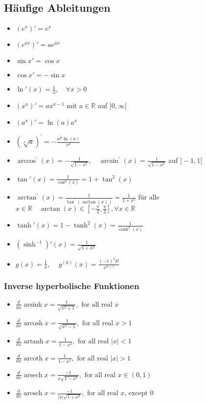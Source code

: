 \documentclass[a3paper, 11pt, landscape]{scrartcl}
\begin{document}
\begin{multicols*}{3}
    \subsection{Häufige Ableitungen}
    \begin{itemize}
        \item $(e^x)' = e^x$
        \item $(e^{ax})' = ae^{ax}$
        \item $\sin x ' = \cos x$
        \item $\cos x ' = -\sin x$
        \item $\ln'(x)=\frac{1}{x}, \quad \forall x >0$
        \item $(x^a)' = ax^{a-1}$ mit $a\in \mathbb{R}$ auf $]0,\infty[$
        \item $(a^x)'=\ln(a)a^x$
        \item $(\sqrt[x]{a})^{\prime}=-\frac{a^{\frac{1}{x}} \ln (a)}{x^{2}}$
        \item $\arccos ^{\prime}(x)=-\frac{1}{\sqrt{1-x^{2}}}, \quad \arcsin ^{\prime}(x)=\frac{1}{\sqrt{1-x^{2}}}$ auf $]-1,1[$
        \item $\tan'(x)=\frac{1}{\cos^2(x)}=1 + \tan^2(x)$
        \item $\arctan ^{\prime}(x)=\frac{1}{\tan ^{\prime}(\arctan (x))}=\frac{1}{1+x^2}$ für alle $x\in \mathbb{R}\quad \arctan (x) \in [-\frac{\pi}{2},\frac{\pi}{2}], \forall x \in \mathbb{R}$ 
        \item $\tanh'(x)=1-\tanh ^2(x)=\frac{1}{\cosh^2(x)}$
        \item $(\sinh ^{-1})' (x)=\frac{1}{\sqrt{1+x^2}}$
        \item $g(x)=\frac{1}{x}$, $\quad g^{(k)}(x)=\frac{(-1)^{k} k !}{x^{k+1}}$
    \end{itemize}
    
    \subsubsection{Inverse hyperbolische Funktionen}
    \begin{itemize}
        \item $\frac{d}{dx} \operatorname{arsinh} x {}= \frac{1}{\sqrt{x^2+1}}, \text{ for all real } x$
        \item $\frac{d}{dx} \operatorname{arcosh} x  {}= \frac{1}{\sqrt{x^2-1}}, \text{ for all real } x>1$
        \item $\frac{d}{dx} \operatorname{artanh} x  {}= \frac{1}{1-x^2}, \text{ for all real } |x|<1$
        \item $\frac{d}{dx} \operatorname{arcoth} x  {}= \frac{1}{1-x^2}, \text{ for all real } |x|>1$
        \item $\frac{d}{dx} \operatorname{arsech} x  {}= \frac{-1}{x\sqrt{1-x^2}}, \text{ for all real } x \in (0,1)$
        \item $\frac{d}{dx} \operatorname{arcsch} x  {}= \frac{-1}{|x|\sqrt{1+x^2}}, \text{ for all real } x\text{, except } 0$
    \end{itemize}
    

\end{multicols*}
\end{document}
